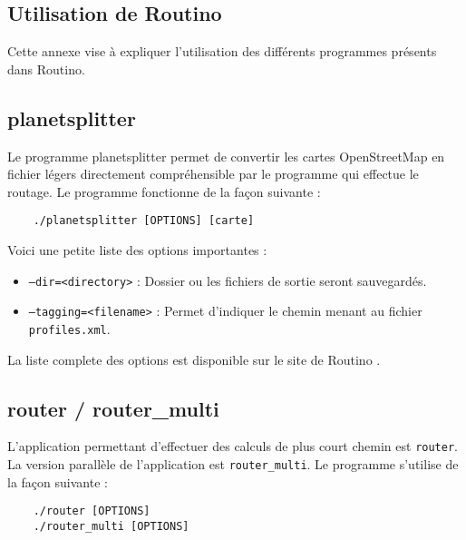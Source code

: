 \begin{appendices}
  \section{Utilisation de Routino}
  \label{ann:routino}

  Cette annexe vise à expliquer l'utilisation des différents programmes présents
  dans Routino.

  \subsection{planetsplitter}
  
  Le programme planetsplitter permet de convertir les cartes OpenStreetMap en 
  fichier légers directement compréhensible par le programme qui effectue le 
  routage. Le programme fonctionne de la façon suivante : \\
 
  \begin{lstlisting}
    ./planetsplitter [OPTIONS] [carte]  
  \end{lstlisting}
  \vspace{1em}

  Voici une petite liste des options importantes :
  
  \begin{itemize}
    \item \texttt{--dir=<directory>} : Dossier ou les fichiers de sortie seront 
      sauvegardés.
    \item \texttt{--tagging=<filename>} : Permet d'indiquer le chemin menant au 
      fichier \texttt{profiles.xml}.\\
  \end{itemize}

  La liste complete des options est disponible sur le site de Routino 
  \cite{bishop_routino_????}.
  
  \subsection{router / router\_multi}
  
  L'application permettant d'effectuer des calculs de plus court chemin est 
  \texttt{router}. La version parallèle de l'application est 
  \texttt{router\_multi}. Le programme s'utilise de la façon suivante : \\

  \begin{lstlisting}
    ./router [OPTIONS]
    ./router_multi [OPTIONS]
  \end{lstlisting}
  \vspace{1em}


\end{appendices}
